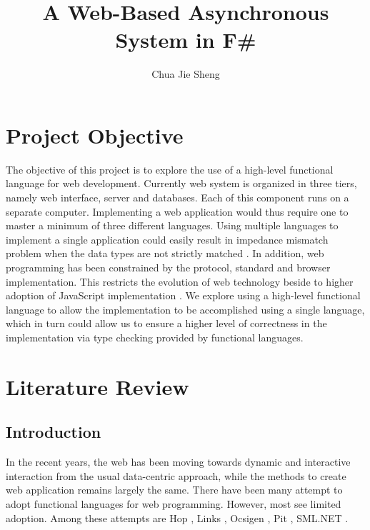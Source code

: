 \documentclass[12pt,fullpage]{article}
\begin{document}
\title{A Web-Based Asynchronous System in F\#}
\author{Chua Jie Sheng}
\maketitle

\section{Project Objective}
The objective of this project is to explore the use of a high-level functional
language for web development. Currently web system is organized in three tiers,
namely web interface, server and databases. Each of this component runs on a
separate computer. Implementing a web application would thus require one to master a
minimum of three different languages. Using multiple languages to implement a
single application could easily result in impedance mismatch problem when the data
types are not strictly matched \parencite{links06}. In addition, web programming
has been constrained by the protocol, standard and browser implementation.
This restricts the evolution of web technology beside to higher adoption of
JavaScript implementation \parencite{balat09}. We explore using a high-level
functional language to allow the implementation to be accomplished using a single language,
which in turn could allow us to ensure a higher level of correctness in the implementation
via type checking provided by functional languages.

\section{Literature Review}
\subsection{Introduction}
In the recent years, the web has been moving towards dynamic and interactive
interaction from the usual data-centric approach, while the methods to create web
application remains largely the same. There have been many attempt to adopt functional
languages for web programming. However, most see limited adoption. Among these attempts are
Hop \parencite{serrano07}, Links \parencite{links06}, Ocsigen \parencite{balat06},
Pit \parencite{paper4}, SML.NET \parencite{benton04}.
\end{document}
